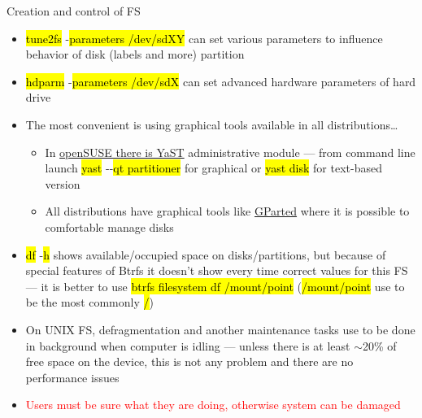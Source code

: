 \documentclass[compress, ucs, xelatex, 11pt, xcolor=svgnames, aspectratio=169,
	hyperref={
		bookmarks=true,
		unicode=true,
		colorlinks=true,
		pdftitle={Linux, command line and MetaCentrum},
		plainpages=false,
		pdfauthor={Vojtech Zeisek},
		pdfsubject={Course about use of Linux command line, writing shell scripts and using MetaCentrum of CESNET},
		pdfcreator={XeLaTeX},
		pdfkeywords={Linux, GNU, BASH, shell, command line, MetaCentrum},
		linkcolor=DarkRed, %
		anchorcolor=DarkBlue, %
		citecolor=Indigo, %
		filecolor=NavyBlue, %
		menucolor=DarkMagenta, %
		urlcolor=DarkBlue, %
		pdftex},
	url={hyphens, lowtilde} %
	]{beamer}
\renewcommand{\texttt}[1]{\hl{\ttfamily #1}}
\renewcommand{\alert}[1]{\textcolor{red}{#1}}
\begin{document}
\begin{frame}[allowframebreaks]{Creation and control of FS}
\begin{itemize}
\begin{itemize}
		\end{itemize}
		\item \texttt{tune2fs} -\texttt{parameters /dev/sdXY} can set various parameters to influence behavior of disk (labels and more) partition
		\item \texttt{hdparm} -\texttt{parameters /dev/sdX} can set advanced hardware parameters of hard drive
		\item The most convenient is using graphical tools available in all distributions\ldots
		\begin{itemize}
			\item In \href{https://en.opensuse.org/Portal:YaST}{openSUSE there is YaST} administrative module --- from command line launch \texttt{yast} -{-}\texttt{qt partitioner} for graphical or \texttt{yast disk} for text-based version
			\item All distributions have graphical tools like \href{https://gparted.org/}{GParted} where it is possible to comfortable manage disks
		\end{itemize}
		\item \texttt{df} -\texttt{h} shows available/occupied space on disks/partitions, but because of special features of Btrfs it doesn't show every time correct values for this FS --- it is better to use \texttt{btrfs filesystem df /mount/point} (\texttt{/mount/point} use to be the most commonly \texttt{/})
		\item On UNIX FS, defragmentation and another maintenance tasks use to be done in background when computer is idling --- unless there is at least $\sim$20\% of free space on the device, this is not any problem and there are no performance issues
		\item \alert{Users must be sure what they are doing, otherwise system can be damaged}
	\end{itemize}
\end{frame}
\end{document}
